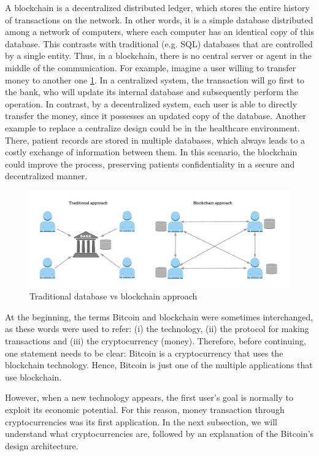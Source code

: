 A blockchain is a decentralized distributed ledger, which stores the entire history of transactions on the network. In other words, it is a simple database distributed among a network of computers, where each computer has an identical copy of this database. This contrasts with traditional (e.g. SQL) databases that are controlled by a single entity. Thus, in a blockchain, there is no central server or agent in the middle of the communication. For example, imagine a user willing to transfer money to another one \ref{fig:CentralizedvsDecentralized}. In a centralized system, the transaction will go first to the bank, who will update its internal database and subsequently perform the operation. In contrast, by a decentralized system, each user is able to directly transfer the money, since it possesses an updated copy of the database. Another example to replace a centralize design could be in the healthcare environment. There, patient records are stored in multiple databases, which always leads to a costly exchange of information between them. In this scenario, the blockchain could improve the process, preserving patients confidentiality in a secure and decentralized manner.

\begin{figure}[bth]
	\centering
	\includegraphics[width=0.8\linewidth]{gfx/cenVsDec}    
  	\caption{Traditional database vs blockchain approach}
  	\label{fig:CentralizedvsDecentralized}
\end{figure}

At the beginning, the terms Bitcoin and blockchain were sometimes interchanged, as these words were used to refer: (i) the technology, (ii) the protocol for making transactions and (iii) the cryptocurrency (money). Therefore, before continuing, one statement needs to be clear: Bitcoin is a cryptocurrency that uses the blockchain technology. Hence, Bitcoin is just one of the multiple applications that use blockchain. 

However, when a new technology appears, the first user's goal is normally to exploit its economic potential. For this reason, money transaction through cryptocurrencies was its first application. In the next subsection, we will understand what cryptocurrencies are, followed by an explanation of the Bitcoin's design architecture.

